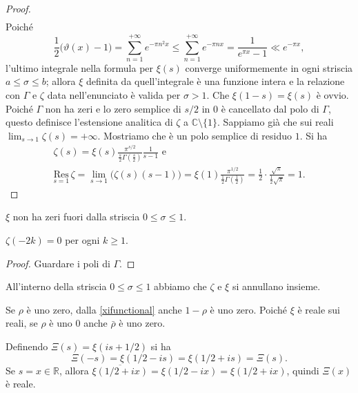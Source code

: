 \begin{proof}
\begin{gather*}
  \end{gather*}
  Poiché
  $$\frac{1}{2}\big(\vartheta(x)-1\big)=\sum_{n=1}^{+\infty} e^{-\pi n^2x} \le \sum_{n=1}^{+\infty} e^{-\pi nx}=\frac{1}{e^{\pi x}-1} \ll e^{-\pi x},$$
  l'ultimo integrale nella formula per $\xi(s)$ converge uniformemente in ogni striscia $a \le \sigma \le b$; allora $\xi$ definita da quell'integrale è una funzione intera e la relazione con $\Gamma$ e $\zeta$ data nell'enunciato è valida per $\sigma>1$. Che $\xi(1-s)=\xi(s)$ è ovvio. Poiché $\Gamma$ non ha zeri e lo zero semplice di $s/2$ in $0$ è cancellato dal polo di $\Gamma$, questo definisce l'estensione analitica di $\zeta$ a $\mathbb{C}\setminus\{1\}$. Sappiamo già che sui reali $\displaystyle \lim_{s \longrightarrow 1} \zeta(s)=+\infty$. Mostriamo che è un polo semplice di residuo $1$. Si ha
  \begin{gather*}
    \zeta(s)=\xi(s)\frac{\pi^{s/2}}{\frac{s}{2}\Gamma\left(\frac{s}{2}\right)}\frac{1}{s-1} \text{ e} \\
    \underset{s=1}{\text{Res}}\,\zeta=\lim_{s \longrightarrow 1} \big(\zeta(s)(s-1)\big)=\xi(1)\frac{\pi^{1/2}}{\frac{1}{2}\Gamma\left(\frac{1}{2}\right)}=\frac{1}{2}\cdot\frac{\sqrt{\pi}}{\frac{1}{2}\sqrt{\pi}}=1.
  \end{gather*}
\end{proof}

\begin{oss}
  $\xi$ non ha zeri fuori dalla striscia $0 \le \sigma \le 1$.
\end{oss}

\begin{cor}
  $\zeta(-2k)=0$ per ogni $k \ge 1$.
\end{cor}

\begin{proof}
  Guardare i poli di $\Gamma$.
\end{proof}

\begin{oss}
  All'interno della striscia  $0 \le \sigma \le 1$ abbiamo che $\zeta$ e $\xi$ si annullano insieme.
\end{oss}

\begin{oss}
  Se $\rho$ è uno zero, dalla \eqref{xifunctional} anche $1-\rho$ è uno zero. Poiché $\xi$ è reale sui reali, se $\rho$ è uno $0$ anche $\bar{\rho}$ è uno zero.
\end{oss}

\begin{oss}
  Definendo $\Xi(s)=\xi(is+1/2)$ si ha
  $$\Xi(-s)=\xi(1/2-is)=\xi(1/2+is)=\Xi(s).$$
  Se $s=x \in \mathbb{R}$, allora $\overline{\xi(1/2+ix)}=\xi(1/2-ix)=\xi(1/2+ix)$, quindi $\Xi(x)$ è reale.
\end{oss}

